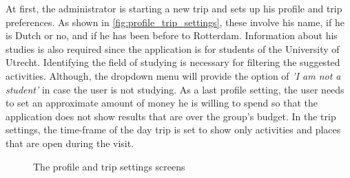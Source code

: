 \documentclass[11pt,a4paper,oneside]{article}
\begin{document}
At first, the administrator is starting a new trip and sets up his profile and trip preferences. As shown in \autoref{fig:profile_trip_settings}, these involve his name, if he is Dutch or no, and if he has been before to Rotterdam. Information about his studies is also required since the application is for students of the University of Utrecht. Identifying the field of studying is necessary for filtering the suggested activities. Although, the dropdown menu will provide the option of \emph{'I am not a student'} in case the user is not studying. As a last profile setting, the user needs to set an approximate amount of money he is willing to spend so that the application does not show results that are over the group's budget. In the trip settings, the time-frame of the day trip is set to show only activities and places that are open during the visit.

\begin{figure}[H]
    \centering
    \qquad
    \caption{The profile and trip settings screens }%
    \label{fig:profile_trip_settings}%
\end{figure}
\end{document}
